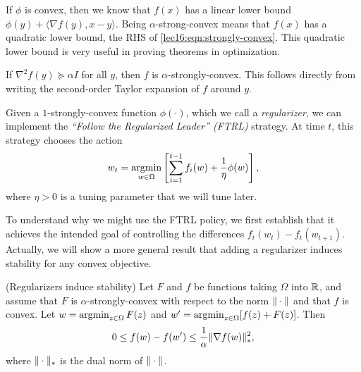 \begin{remark}
If $\phi$ is convex, then we know that $f(x)$ has a linear lower bound $\phi(y) + \langle \nabla f(y), x - y \rangle$. Being $\alpha$-strong-convex means that $f(x)$ has a quadratic lower bound, the RHS of \eqref{lec16:eqn:strongly-convex}. This quadratic lower bound is very useful in proving theorems in optimization.
\end{remark}

\begin{remark}
If $\nabla^2 f(y) \succeq \alpha I$ for all $y$, then $f$ is $\alpha$-strongly-convex. This follows directly from writing the second-order Taylor expansion of $f$ around $y$.
\end{remark}

Given a $1$-strongly-convex function $\phi(\cdot)$, which we call a \textit{regularizer}, we can implement the \textit{``Follow the Regularized Leader'' (FTRL)} strategy.  At time $t$, this strategy chooses the action
\begin{align}
w_t = \operatorname*{\textup{argmin}}_{w \in \Omega} \left[ \sum_{i = 1}^{t -1} f_i(w) + \frac{1}{\eta} \phi(w) \right], \label{lec16:eqn:ftrl}
\end{align}
where $\eta > 0$ is a tuning parameter that we will tune later.


To understand why we might use the FTRL policy, we first establish that it achieves the intended goal of controlling the differences $f_t(w_t) - f_t(w_{t+1})$. Actually, we will show a more general result that adding a regularizer induces stability for any convex objective.

\begin{lemma}
\label{lec16:lem:regularizers_stability}
\textup{(Regularizers induce stability)} Let $F$ and $f$ be functions taking $\Omega$ into $\mathbb R$, and assume that $F$ is $\alpha$-strongly-convex with respect to the norm $\|\cdot\|$ and that $f$ is convex.  Let $w = \operatorname*{\textup{argmin}}_{z \in \Omega} F(z)$ and $w' = \operatorname*{\textup{argmin}}_{z \in \Omega} [f(z) + F(z)]$.  Then
\begin{equation}\label{lec16:eqn:regularizers_stability}
0 \leq f(w) - f(w') \leq \frac{1}{\alpha} \|\nabla f(w)\|_*^2,
\end{equation}
where $\|\cdot\|_*$ is the dual norm of $\|\cdot\|$.
\end{lemma}


